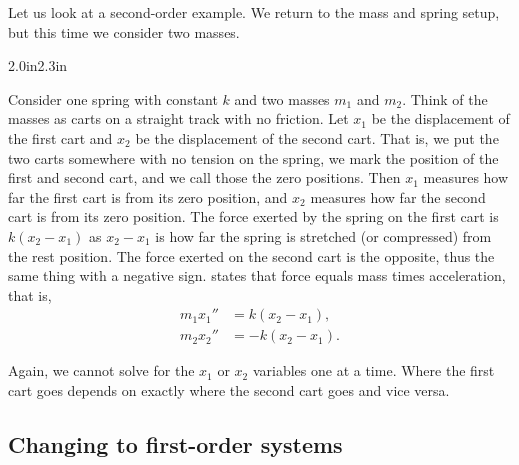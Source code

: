 \begin{example} \label{sintro:carts-example}
Let us look at a second-order example.
We return to the mass and spring setup, but this time we
consider two masses.

\begin{mywrapfigsimp}{2.0in}{2.3in}
\noindent
{}
\end{mywrapfigsimp}
Consider one spring with constant $k$ and two masses $m_1$
and $m_2$.  Think of the masses as carts on
a straight track with no friction.  Let $x_1$ be the displacement of the first
cart and $x_2$ be the displacement of the second cart.
That is, we put the two
carts somewhere with no tension on the spring,
we mark the position of
the first and second cart,
and we call those the zero positions.
Then $x_1$ measures how far the first cart is from its zero position,
and $x_2$ measures how far the second cart is from its zero position.
The force exerted by the spring on the first cart is
$k(x_2-x_1)$
as $x_2-x_1$ is how far the spring is stretched (or compressed) from
the rest position.
The force exerted on the second cart is the opposite,
thus the same thing with a negative sign.
 states that
force equals mass times acceleration, that is,
\begin{equation*}
\begin{aligned}
m_1 x_1'' & = k(x_2-x_1) , \\
m_2 x_2'' & = - k(x_2-x_1) .
\end{aligned}
\end{equation*}

Again, we cannot solve for the $x_1$ or $x_2$ variables
one at a time.  Where the first cart goes
depends on exactly where the second cart goes and vice versa.
\end{example}

\subsection{Changing to first-order systems}

